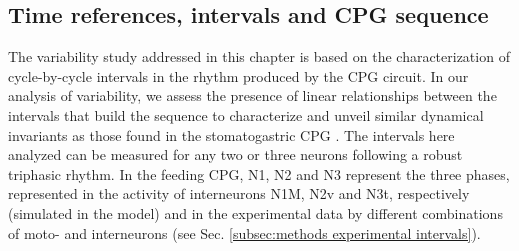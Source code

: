 
\subsection{Time references, intervals and CPG sequence}
\label{subsec:intervals}
The variability study addressed in this chapter is based on the characterization of cycle-by-cycle intervals in the rhythm produced by the CPG circuit.
In our analysis of variability, we assess the presence of linear relationships between the intervals that build the sequence to characterize and unveil similar dynamical invariants as those found in the stomatogastric CPG \parencite{elices_robust_2019}. 
The intervals here analyzed can be measured for any two or three neurons following a robust triphasic rhythm. In the feeding CPG, N1, N2 and N3 represent the three phases, represented in the activity of interneurons N1M, N2v and N3t, respectively (simulated in the model) and in the experimental data by different combinations of moto- and interneurons (see Sec. \ref{subsec:methods experimental intervals}).

